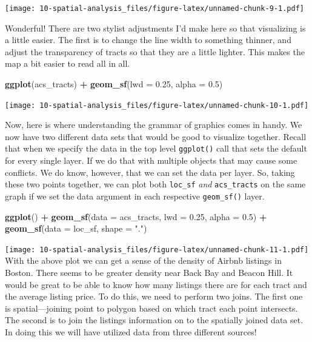 \documentclass[
]{book}
\newenvironment{Shaded}{\begin{snugshade}}{\end{snugshade}}
\newcommand{\DataTypeTok}[1]{\textcolor[rgb]{0.13,0.29,0.53}{#1}}
\newcommand{\FloatTok}[1]{\textcolor[rgb]{0.00,0.00,0.81}{#1}}
\newcommand{\KeywordTok}[1]{\textcolor[rgb]{0.13,0.29,0.53}{\textbf{#1}}}
\newcommand{\NormalTok}[1]{#1}
\newcommand{\OperatorTok}[1]{\textcolor[rgb]{0.81,0.36,0.00}{\textbf{#1}}}
\newcommand{\StringTok}[1]{\textcolor[rgb]{0.31,0.60,0.02}{#1}}
\begin{document}
\texttt{[image: 10-spatial-analysis\_files/figure-latex/unnamed-chunk-9-1.pdf]}

Wonderful! There are two stylist adjustments I'd make here so that visualizing is a little easier. The first is to change the line width to something thinner, and adjust the transparency of tracts so that they are a little lighter. This makes the map a bit easier to read all in all.

\begin{Shaded}
\begin{Highlighting}[]
\KeywordTok{ggplot}\NormalTok{(acs\_tracts) }\OperatorTok{+}
\StringTok{  }\KeywordTok{geom\_sf}\NormalTok{(}\DataTypeTok{lwd =} \FloatTok{0.25}\NormalTok{, }\DataTypeTok{alpha =} \FloatTok{0.5}\NormalTok{)}
\end{Highlighting}
\end{Shaded}

\texttt{[image: 10-spatial-analysis\_files/figure-latex/unnamed-chunk-10-1.pdf]}

Now, here is where understanding the grammar of graphics comes in handy. We now have two different data sets that would be good to visualize together. Recall that when we specify the data in the top level \texttt{ggplot()} call that sets the default for every single layer. If we do that with multiple objects that may cause some conflicts. We do know, however, that we can set the data per layer. So, taking these two points together, we can plot both \texttt{loc\_sf} \emph{and} \texttt{acs\_tracts} on the same graph if we set the data argument in each respective \texttt{geom\_sf()} layer.

\begin{Shaded}
\begin{Highlighting}[]
\KeywordTok{ggplot}\NormalTok{() }\OperatorTok{+}
\StringTok{  }\KeywordTok{geom\_sf}\NormalTok{(}\DataTypeTok{data =}\NormalTok{ acs\_tracts, }\DataTypeTok{lwd =} \FloatTok{0.25}\NormalTok{, }\DataTypeTok{alpha =} \FloatTok{0.5}\NormalTok{) }\OperatorTok{+}
\StringTok{  }\KeywordTok{geom\_sf}\NormalTok{(}\DataTypeTok{data =}\NormalTok{ loc\_sf, }\DataTypeTok{shape =} \StringTok{"."}\NormalTok{)}
\end{Highlighting}
\end{Shaded}

\texttt{[image: 10-spatial-analysis\_files/figure-latex/unnamed-chunk-11-1.pdf]}
With the above plot we can get a sense of the density of Airbnb listings in Boston. There seems to be greater density near Back Bay and Beacon Hill. It would be great to be able to know how many listings there are for each tract and the average listing price. To do this, we need to perform two joins. The first one is spatial---joining point to polygon based on which tract each point intersects. The second is to join the listings information on to the spatially joined data set. In doing this we will have utilized data from three different sources!
\end{document}
